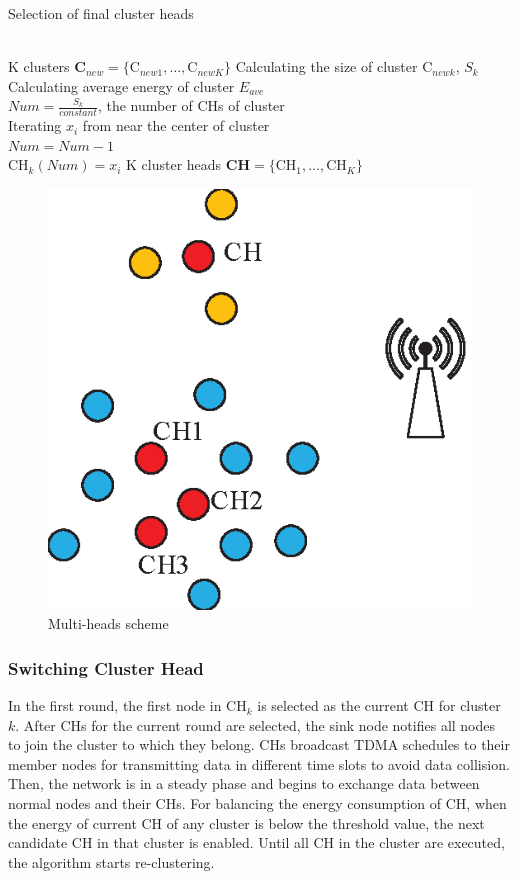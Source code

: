 \documentclass[11pt]{report}
\newcommand{\mb}{\mathbf}
\begin{document}
	\begin{algorithm}[h!]
		\caption{Selection of final cluster heads}
		\LinesNumbered %
		\KwIn
		{\\K clusters $\mb{C}_{new} = \{\text{C}_{new1},\dots,\text{C}_{newK}\}$ }
		{Calculating the size of cluster $\text{C}_{newk}$, $S_k$\\
		Calculating average energy of cluster $E_{ave}$\\
		$Num = \frac{S_k}{constant}$, the number of CHs of cluster\\
		{Iterating $x_i$ from near the center of cluster\\
			
			{$Num = Num - 1$\\
		    $\text{CH}_k\left(Num\right) = x_i$}}
        }
		K cluster heads $\mb{CH} = \{\text{CH}_1,\dots,\text{CH}_K \}$
	\end{algorithm}
	\begin{figure}[h!]
		\centering
		\includegraphics[width=0.25\linewidth]{multihead.eps}
		\caption{Multi-heads scheme}
		\label{fig7}
	\end{figure}
	\subsubsection{Switching Cluster Head}
	
	\noindent In the first round, the first node in $\text{CH}_k$ is selected as the current CH for cluster $k$. After CHs for the current round are selected, the sink node notifies all nodes to join the cluster to which they belong. CHs broadcast TDMA schedules to their member nodes for transmitting data in different time slots to avoid data collision. Then, the network is in a steady phase and begins to exchange data between normal nodes and their CHs. For balancing the energy consumption of CH, when the energy of current CH of any cluster is below the threshold value, the next candidate CH in that cluster is enabled. Until all CH in the cluster are executed, the algorithm starts re-clustering.\\
	
\end{document}
